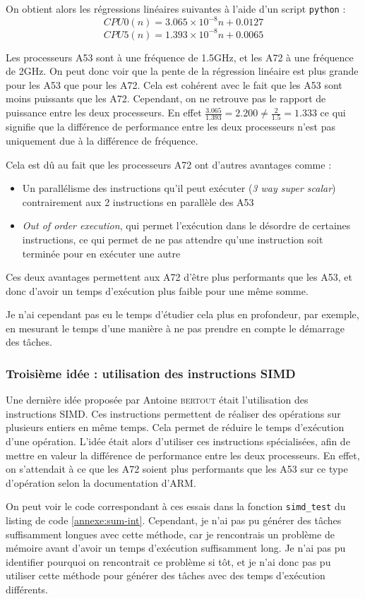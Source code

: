 On obtient alors les régressions linéaires suivantes à l'aide d'un script \texttt{python} :
\[
    CPU0(n) =  3.065 \times 10^{-8} n +  0.0127 
\] 
\[
    CPU5(n) =  1.393 \times 10^{-8} n +  0.0065
\]

Les processeurs A53 sont à une fréquence de 1.5GHz, et les A72 à une fréquence de 2GHz. On peut donc voir que la pente de la régression linéaire est plus grande pour les A53 que pour les A72. Cela est cohérent avec le fait que les A53 sont moins puissants que les A72. Cependant, on ne retrouve pas le rapport de puissance entre les deux processeurs. En effet $\frac{3.065}{1.393} = 2.200 \neq \frac{2}{1.5} = 1.333$ ce qui signifie que la différence de performance entre les deux processeurs n'est pas uniquement due à la différence de fréquence.


Cela est dû au fait que les processeurs A72 ont d'autres avantages comme :
\begin{itemize}
    \item Un parallélisme des instructions qu'il peut exécuter (\textit{3 way super scalar}) contrairement aux 2 instructions en parallèle des A53
    \item \textit{Out of order execution}, qui permet l’exécution dans le désordre de certaines instructions, ce qui permet de ne pas attendre qu'une instruction soit terminée pour en exécuter une autre
\end{itemize}

Ces deux avantages permettent aux A72 d'être plus performants que les A53, et donc d'avoir un temps d'exécution plus faible pour une même somme.

Je n'ai cependant pas eu le temps d'étudier cela plus en profondeur, par exemple, en mesurant le temps d'une manière à ne pas prendre en compte le démarrage des tâches. 


\subsubsection{Troisième idée : utilisation des instructions SIMD}

Une dernière idée proposée par Antoine \textsc{bertout} était l'utilisation des instructions SIMD. Ces instructions permettent de réaliser des opérations sur plusieurs entiers en même temps. Cela permet de réduire le temps d'exécution d'une opération. L'idée était alors d'utiliser ces instructions spécialisées, afin de mettre en valeur la différence de performance entre les deux processeurs. En effet, on s'attendait à ce que les A72 soient plus performants que les A53 sur ce type d'opération selon la documentation d'ARM.

On peut voir le code correspondant à ces essais dans la fonction \texttt{simd\_test} du listing de code \ref{annexe:sum-int}. Cependant, je n'ai pas pu générer des tâches suffisamment longues avec cette méthode, car je rencontrais un problème de mémoire avant d'avoir un temps d'exécution suffisamment long. Je n'ai pas pu identifier pourquoi on rencontrait ce problème si tôt, et je n'ai donc pas pu utiliser cette méthode pour générer des tâches avec des temps d'exécution différents.
